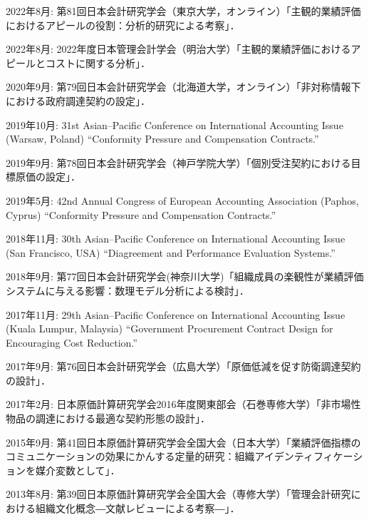 \documentclass[letterpaper,11pt]{article}
\renewenvironment{itemize}{
  \begin{list}{}{
    \setlength{\leftmargin}{1.5em}
  }
}{
  \end{list}
}
\begin{document}
\begin{itemize}
    \item 2022年8月: 第81回日本会計研究学会（東京大学，オンライン）「主観的業績評価におけるアピールの役割：分析的研究による考察」．

   \item 2022年8月: 2022年度日本管理会計学会（明治大学）「主観的業績評価におけるアピールとコストに関する分析」．

  \item 2020年9月: 第79回日本会計研究学会（北海道大学，オンライン）「非対称情報下における政府調達契約の設定」．

  \item 2019年10月: 31st Asian--Pacific Conference on International Accounting Issue (Warsaw, Poland) ``Conformity Pressure and Compensation Contracts.''

  \item 2019年9月: 第78回日本会計研究学会（神戸学院大学）「個別受注契約における目標原価の設定」．

  \item 2019年5月: 42nd Annual Congress of European Accounting Association (Paphos, Cyprus) ``Conformity Pressure and Compensation Contracts.''

  \item 2018年11月: 30th Asian--Pacific Conference on International Accounting Issue (San Francisco, USA) ``Diagreement and Performance Evaluation Systems.''

  \item 2018年9月: 第77回日本会計研究学会(神奈川大学)「組織成員の楽観性が業績評価システムに与える影響：数理モデル分析による検討」．

	\item 2017年11月: 29th Asian--Pacific Conference on International Accounting Issue (Kuala Lumpur, Malaysia) ``Government Procurement Contract Design for Encouraging Cost Reduction.''

	\item 2017年9月: 第76回日本会計研究学会（広島大学）「原価低減を促す防衛調達契約の設計」．

	\item 2017年2月: 日本原価計算研究学会2016年度関東部会（石巻専修大学）「非市場性物品の調達における最適な契約形態の設計」．

	\item 2015年9月: 第41回日本原価計算研究学会全国大会（日本大学）「業績評価指標のコミュニケーションの効果にかんする定量的研究：組織アイデンティフィケーションを媒介変数として」．

	\item 2013年8月: 第39回日本原価計算研究学会全国大会（専修大学）「管理会計研究における組織文化概念―文献レビューによる考察―」．
\end{itemize}
\end{document}
